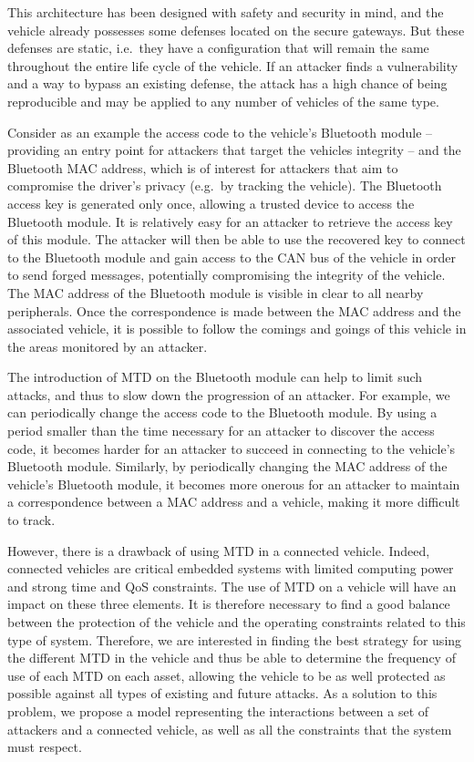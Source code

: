 This architecture has been designed with safety and security in mind, and the vehicle already possesses some defenses located on the secure gateways. But these defenses are static, i.e.~they have a configuration that will remain the same throughout the entire life cycle of the vehicle. If an attacker finds a vulnerability and a way to bypass an existing defense, the attack has a high chance of being reproducible and may be applied to any number of vehicles of the same type. 

Consider as an example the access code to the vehicle's Bluetooth module -- providing an entry point for attackers that target the vehicles integrity -- and the Bluetooth MAC address, which is of interest for attackers that aim to compromise the driver's privacy (e.g.~by tracking the vehicle).
The Bluetooth access key is generated only once, allowing a trusted device to access the Bluetooth module. 
It is relatively easy for an attacker to retrieve the access key of this module. The attacker will then be able to use the recovered key to connect to the Bluetooth module and gain access to the CAN bus of the vehicle in order to send forged messages, potentially compromising the integrity of the vehicle.
The MAC address of the Bluetooth module is visible in clear to all nearby peripherals. Once the correspondence is made between the MAC address and the associated vehicle, it is possible to follow the comings and goings of this vehicle in the areas monitored by an attacker. 
 
The introduction of MTD on the Bluetooth module can help to limit such attacks, and thus to slow down the progression of an attacker.
For example, we can periodically change the access code to the Bluetooth module. By using a period smaller than the time necessary for an attacker to discover the access code, it becomes harder for an attacker to succeed in connecting to the vehicle's Bluetooth module.
Similarly, by periodically changing the MAC address of the vehicle's Bluetooth module, it becomes more onerous for an attacker to maintain a correspondence between a MAC address and a vehicle, making it more difficult to track. 

However, there is a drawback of using MTD in a connected vehicle. Indeed, connected vehicles are critical embedded systems with limited computing power and strong time and QoS constraints.
The use of MTD on a vehicle will have an impact on these three elements. It is therefore necessary to find a good balance between the protection of the vehicle and the operating constraints related to this type of system.
Therefore, we are interested in finding the best strategy for using the different MTD in the vehicle and thus be able to determine the frequency of use of each MTD on each asset, allowing the vehicle to be as well protected as possible against all types of existing and future attacks. 
As a solution to this problem, we propose a model representing the interactions between a set of attackers and a connected vehicle, as well as all the constraints that the system must respect.


